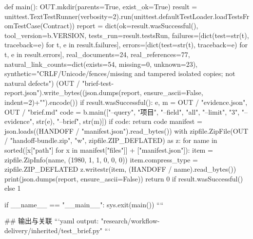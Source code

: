 def main():
    OUT.mkdir(parents=True, exist_ok=True)
    result = unittest.TextTestRunner(verbosity=2).run(unittest.defaultTestLoader.loadTestsFromTestCase(Contract))
    report = dict(ok=result.wasSuccessful(), tool_version=b.VERSION, tests_run=result.testsRun,
                  failures=[dict(test=str(t), traceback=e) for t, e in result.failures],
                  errors=[dict(test=str(t), traceback=e) for t, e in result.errors],
                  real_documents=24, real_references=77,
                  natural_link_counts=dict(exists=54, missing=0, unknown=23),
                  synthetic="CRLF/Unicode/fences/missing and tampered isolated copies; not natural defects")
    (OUT / "brief-test-report.json").write_bytes((json.dumps(report, ensure_ascii=False, indent=2)+"\n").encode())
    if result.wasSuccessful():
        e, m = OUT / "evidence.json", OUT / "brief.md"
        code = b.main(["--query", "项目", "--field", "all", "--limit", "3",
                       "--evidence", str(e), "--brief", str(m)])
        if code:
            return code
        manifest = json.loads((HANDOFF / "manifest.json").read_bytes())
        with zipfile.ZipFile(OUT / "handoff-bundle.zip", "w", zipfile.ZIP_DEFLATED) as z:
            for name in sorted([x["path"] for x in manifest["files"]] + ["manifest.json"]):
                item = zipfile.ZipInfo(name, (1980, 1, 1, 0, 0, 0))
                item.compress_type = zipfile.ZIP_DEFLATED
                z.writestr(item, (HANDOFF / name).read_bytes())
    print(json.dumps(report, ensure_ascii=False))
    return 0 if result.wasSuccessful() else 1


if __name__ == "__main__":
    sys.exit(main())
````

## 输出与关联
```yaml
output: "research/workflow-delivery/inherited/test_brief.py"
```
